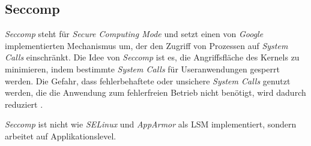 \documentclass[../main.tex]{subfiles}
\begin{document}
{					%




    \subsection{Seccomp}
		\label{seccomp}


			\emph{Seccomp} steht für \emph{Secure Computing Mode} und setzt einen von \emph{Google} implementierten Mechanismus um, der den Zugriff von Prozessen auf \emph{System Calls} einschränkt. Die Idee von \emph{Seccomp} ist es, die Angriffsfläche des Kernels zu minimieren, indem bestimmte \emph{System Calls} für Useranwendungen gesperrt werden. Die Gefahr, dass fehlerbehaftete oder unsichere \emph{System Calls} genutzt werden, die die Anwendung zum fehlerfreien Betrieb nicht benötigt, wird dadurch reduziert \cite{linuxSecOverview}\cite{seccompGitDesc}\cite{secInFuture}.

			\emph{Seccomp} ist nicht wie \emph{SELinux} und \emph{AppArmor} als LSM implementiert, sondern arbeitet auf Applikationslevel.

}
\end{document}
